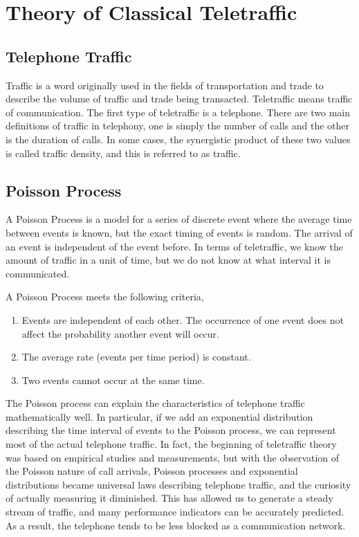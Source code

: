 \chapter{Theory of Classical Teletraffic}
\label{theory_of_classical_teletraffic}
\section{Telephone Traffic}
Traffic is a word originally used in the fields of transportation and trade to describe the volume of traffic and trade being transacted.
Teletraffic means traffic of communication.
The first type of teletraffic is a telephone.
There are two main definitions of traffic in telephony, one is simply the number of calls and the other is the duration of calls.
In some cases, the synergistic product of these two values is called traffic density, and this is referred to as traffic.\cite{teletraffic1954}

\section{Poisson Process}
A Poisson Process is a model for a series of discrete event where the average time between events is known, but the exact timing of events is random.
The arrival of an event is independent of the event before.\cite{poisson}
In terms of teletraffic, we know the amount of traffic in a unit of time, but we do not know at what interval it is communicated.

A Poisson Process meets the following criteria,\cite{poisson}
\begin{enumerate}
    \item Events are independent of each other. The occurrence of one event does not affect the probability another event will occur.
    \item The average rate (events per time period) is constant.
    \item Two events cannot occur at the same time.
\end{enumerate}

The Poisson process can explain the characteristics of telephone traffic mathematically well.
In particular, if we add an exponential distribution describing the time interval of events to the Poisson process, we can represent most of the actual telephone traffic.
In fact, the beginning of teletraffic theory was based on empirical studies and measurements, but with the observation of the Poisson nature of call arrivals, Poisson processes and exponential distributions became universal laws describing telephone traffic, and the curiosity of actually measuring it diminished.
This has allowed us to generate a steady stream of traffic, and many performance indicators can be accurately predicted. As a result, the telephone tends to be less blocked as a communication network.\cite{willinger1998mathematics}

